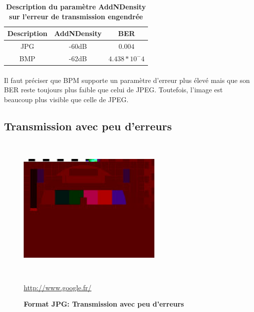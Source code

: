 \begin{table}[!ht]%
\begin{center}
\begin{tabular}{|c|c|c|}
\hline 
Description &AddNDensity &BER\\
\hline 
\scriptsize{JPG}&\scriptsize  {-­60dB}&\scriptsize  {$0.004$}\\
\hline
 \scriptsize{BMP} & \scriptsize {-­62dB}&\scriptsize  {$4.438*10^-4$}\\
\hline 
\end{tabular}
\end{center}
\caption{\textbf{Description du paramètre AddNDensity sur l'erreur de transmission engendrée}}
\label{tab2}
\end{table}
\paragraph{}
\paragraph{}
Il faut préciser que BPM supporte un paramètre d'erreur plus élevé mais que son BER reste toujours plus faible que celui de JPEG. Toutefois, l'image est beaucoup plus visible que celle de JPEG. 

\subsection{Transmission avec peu d’erreurs}
\paragraph{}




\begin{figure}[bth]%
\begin{center}
\includegraphics[height=70mm,width=70mm]{jpg_test_bruit64dB}%
\caption{\textbf{Format JPG: Transmission avec peu d’erreurs}}%
\url {http://www.google.fr/}
\label{jpg_test_bruit64dB}%
\end {center}
\end{figure}

